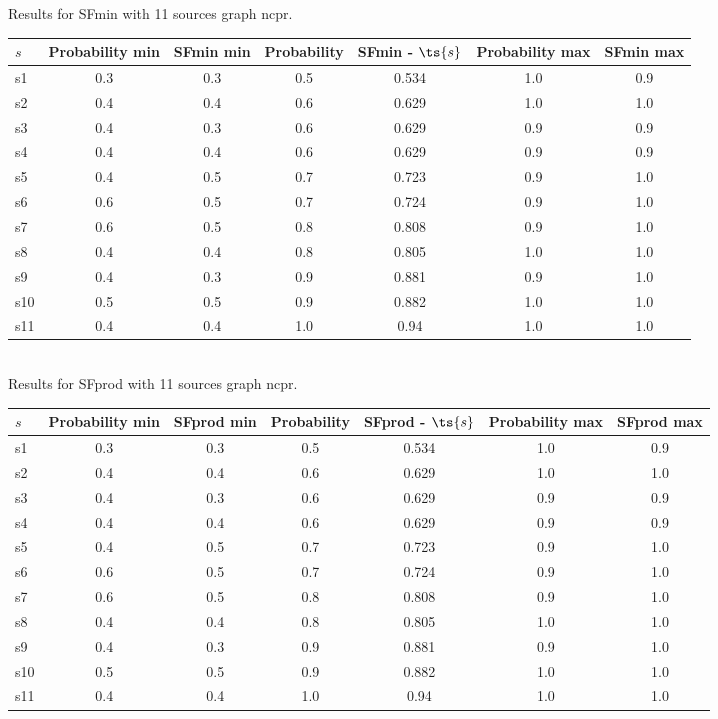 \documentclass{article}
\begin{document}
\noindent Results for SFmin with 11 sources graph ncpr.

\noindent\begin{tabular}{|l|c|c|c|c|c|c|}
\hline
$s$& Probability min & SFmin min & Probability & SFmin - $\ts{s}$ & Probability max & SFmin max\\
\hline
s1 &0.3 & 0.3 & 0.5 & 0.534 & 1.0 & 0.9\\
\hline
s2 &0.4 & 0.4 & 0.6 & 0.629 & 1.0 & 1.0\\
\hline
s3 &0.4 & 0.3 & 0.6 & 0.629 & 0.9 & 0.9\\
\hline
s4 &0.4 & 0.4 & 0.6 & 0.629 & 0.9 & 0.9\\
\hline
s5 &0.4 & 0.5 & 0.7 & 0.723 & 0.9 & 1.0\\
\hline
s6 &0.6 & 0.5 & 0.7 & 0.724 & 0.9 & 1.0\\
\hline
s7 &0.6 & 0.5 & 0.8 & 0.808 & 0.9 & 1.0\\
\hline
s8 &0.4 & 0.4 & 0.8 & 0.805 & 1.0 & 1.0\\
\hline
s9 &0.4 & 0.3 & 0.9 & 0.881 & 0.9 & 1.0\\
\hline
s10 &0.5 & 0.5 & 0.9 & 0.882 & 1.0 & 1.0\\
\hline
s11 &0.4 & 0.4 & 1.0 & 0.94 & 1.0 & 1.0\\
\hline
\end{tabular}\\

\noindent Results for SFprod with 11 sources graph ncpr.

\noindent\begin{tabular}{|l|c|c|c|c|c|c|}
\hline
$s$& Probability min & SFprod min & Probability & SFprod - $\ts{s}$ & Probability max & SFprod max\\
\hline
s1 &0.3 & 0.3 & 0.5 & 0.534 & 1.0 & 0.9\\
\hline
s2 &0.4 & 0.4 & 0.6 & 0.629 & 1.0 & 1.0\\
\hline
s3 &0.4 & 0.3 & 0.6 & 0.629 & 0.9 & 0.9\\
\hline
s4 &0.4 & 0.4 & 0.6 & 0.629 & 0.9 & 0.9\\
\hline
s5 &0.4 & 0.5 & 0.7 & 0.723 & 0.9 & 1.0\\
\hline
s6 &0.6 & 0.5 & 0.7 & 0.724 & 0.9 & 1.0\\
\hline
s7 &0.6 & 0.5 & 0.8 & 0.808 & 0.9 & 1.0\\
\hline
s8 &0.4 & 0.4 & 0.8 & 0.805 & 1.0 & 1.0\\
\hline
s9 &0.4 & 0.3 & 0.9 & 0.881 & 0.9 & 1.0\\
\hline
s10 &0.5 & 0.5 & 0.9 & 0.882 & 1.0 & 1.0\\
\hline
s11 &0.4 & 0.4 & 1.0 & 0.94 & 1.0 & 1.0\\
\hline
\end{tabular}\\
\end{document}
